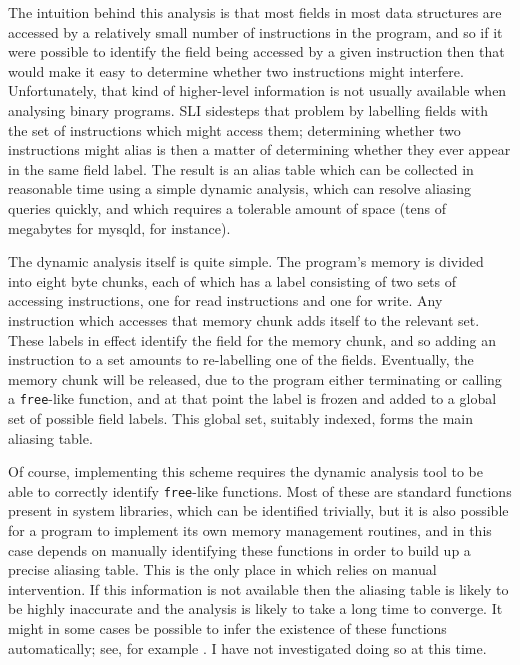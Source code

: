 The intuition behind this analysis is that most fields in most data
structures are accessed by a relatively small number of instructions
in the program, and so if it were possible to identify the field being
accessed by a given instruction then that would make it easy to
determine whether two instructions might interfere.
Unfortunately, that kind of higher-level information is not usually
available when analysing binary programs.  SLI sidesteps that problem
by labelling fields with the set of instructions which might access
them; determining whether two instructions might alias is then a
matter of determining whether they ever appear in the same field
label.  The result is an alias table which can be collected in
reasonable time using a simple dynamic analysis, which can resolve
aliasing queries quickly, and which requires a tolerable amount of
space (tens of megabytes for mysqld, for instance).

The dynamic analysis itself is quite simple.  The program's memory is
divided into eight byte chunks, each of which has a label consisting
of two sets of accessing instructions, one for read instructions and
one for write.  Any instruction which accesses that memory chunk adds
itself to the relevant set.  These labels in effect identify the field for
the memory chunk, and so adding an instruction to a set amounts to
re-labelling one of the fields.  Eventually, the memory chunk will be
released, due to the program either terminating or calling a
\verb|free|-like function, and at that point the label is frozen and
added to a global set of possible field labels.  This global set,
suitably indexed, forms the main aliasing table.

Of course, implementing this scheme requires the dynamic analysis tool
to be able to correctly identify \verb|free|-like functions.  Most of
these are standard functions present in system libraries, which can be
identified trivially, but it is also possible for a program to
implement its own memory management routines, and in this case
{\technique} depends on manually identifying these functions in order
to build up a precise aliasing table.  This is the only place in which
{\technique} relies on manual intervention.  If this information is
not available then the aliasing table is likely to be highly
inaccurate and the analysis is likely to take a long time to
converge.  It might in some cases be
possible to infer the existence of these functions automatically; see,
for example .  I have not investigated doing so at this
time.

